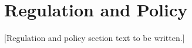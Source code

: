 
\section{Regulation and Policy}
\label{sec:regulation}


[Regulation and policy section text to be written.]
